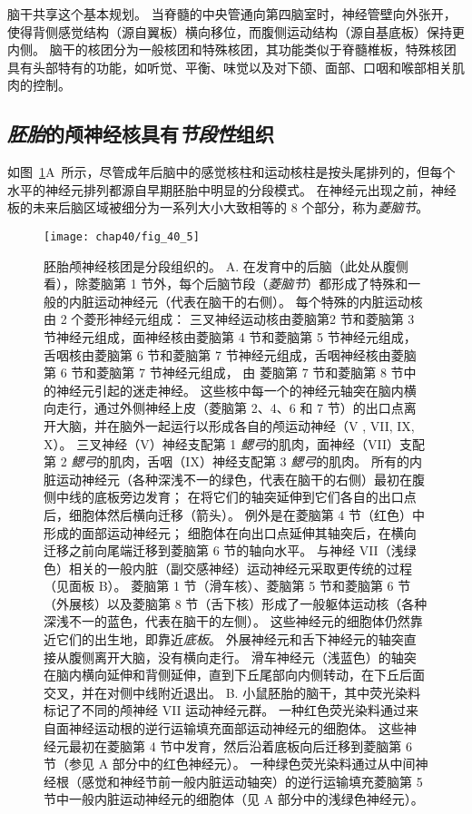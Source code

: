 脑干共享这个基本规划。
当脊髓的中央管通向第四脑室时，神经管壁向外张开，使得背侧感觉结构（源自翼板）横向移位，而腹侧运动结构（源自基底板）保持更内侧。
脑干的核团分为一般核团和特殊核团，其功能类似于脊髓椎板，特殊核团具有头部特有的功能，如听觉、平衡、味觉以及对下颌、面部、口咽和喉部相关肌肉的控制。



\subsection{\textit{胚胎}的颅神经核具有\textit{节段性}组织}

如图~\ref{fig:40_5}A~所示，尽管成年后脑中的感觉核柱和运动核柱是按头尾排列的，但每个水平的神经元排列都源自早期胚胎中明显的分段模式。
在神经元出现之前，神经板的未来后脑区域被细分为一系列大小大致相等的 8 个部分，称为\textit{菱脑节}。


\begin{figure}[htbp]
	\centering
	\texttt{[image: chap40/fig\_40\_5]}
	\caption{胚胎颅神经核团是分段组织的。
		A. 在发育中的后脑（此处从腹侧看），除菱脑第 1 节外，每个后脑节段（\textit{菱脑节}）都形成了特殊和一般的内脏运动神经元（代表在脑干的右侧）。
		每个特殊的内脏运动核由 2 个菱形神经元组成：
		三叉神经运动核由菱脑第2 节和菱脑第 3 节神经元组成，面神经核由菱脑第 4 节和菱脑第 5 节神经元组成，舌咽核由菱脑第 6 节和菱脑第 7 节神经元组成，舌咽神经核由菱脑第 6 节和菱脑第 7 节神经元组成， 由 菱脑第 7 节和菱脑第 8 节中的神经元引起的迷走神经。
		这些核中每一个的神经元轴突在脑内横向走行，通过外侧神经上皮（菱脑第 2、4、6 和 7 节）的出口点离开大脑，并在脑外一起运行以形成各自的颅运动神经（V , VII, IX, X）。
		三叉神经（V）神经支配第 1 \textit{鳃弓}的肌肉，面神经（VII）支配第 2 \textit{鳃弓}的肌肉，舌咽（IX）神经支配第 3 \textit{鳃弓}的肌肉。
		所有的内脏运动神经元（各种深浅不一的绿色，代表在脑干的右侧）最初在腹侧中线的底板旁边发育； 
		在将它们的轴突延伸到它们各自的出口点后，细胞体然后横向迁移（箭头）。
		例外是在菱脑第 4 节（红色）中形成的面部运动神经元；
		细胞体在向出口点延伸其轴突后，在横向迁移之前向尾端迁移到菱脑第 6 节的轴向水平。
		与神经 VII（浅绿色）相关的一般内脏（副交感神经）运动神经元采取更传统的过程（见面板 B）。
		菱脑第 1 节（滑车核）、菱脑第 5 节和菱脑第 6 节（外展核）以及菱脑第 8 节（舌下核）形成了一般躯体运动核（各种深浅不一的蓝色，代表在脑干的左侧）。
		这些神经元的细胞体仍然靠近它们的出生地，即靠近\textit{底板}。
		外展神经元和舌下神经元的轴突直接从腹侧离开大脑，没有横向走行。
		滑车神经元（浅蓝色）的轴突在脑内横向延伸和背侧延伸，直到下丘尾部向内侧转动，在下丘后面交叉，并在对侧中线附近退出。
		B. 小鼠胚胎的脑干，其中荧光染料标记了不同的颅神经 VII 运动神经元群。
		一种红色荧光染料通过来自面神经运动根的逆行运输填充面部运动神经元的细胞体。
		这些神经元最初在菱脑第 4 节中发育，然后沿着底板向后迁移到菱脑第 6 节（参见 A 部分中的红色神经元）。
		一种绿色荧光染料通过从中间神经根（感觉和神经节前一般内脏运动轴突）的逆行运输填充菱脑第 5 节中一般内脏运动神经元的细胞体（见 A 部分中的浅绿色神经元）。}
	\label{fig:40_5}
\end{figure}


